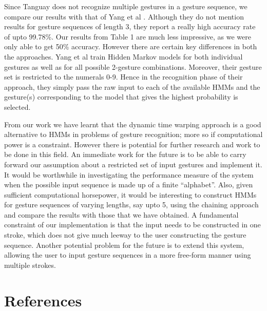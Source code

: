 \documentclass[twoside]{article}
\begin{document}
\begin{multicols}{2}
Since Tanguay does not recognize multiple gestures in a gesture sequence, we compare our results with that of Yang et al \cite{yang_gesture_1994}. Although they do not mention results for gesture sequences of length 3, they report a really high accuracy rate of upto 99.78\%. Our results from Table 1 are much less impressive, as we were only able to get 50\% accuracy. However there are certain key differences in both the approaches. Yang et al train Hidden Markov models for both individual gestures as well as for all possible 2-gesture combinations. Moreover, their gesture set is restricted to the numerals 0-9. Hence in the recognition phase of their approach, they simply pass the raw input to each of the available HMMs and the gesture(s) corresponding to the model that gives the highest probability is selected.

From our work we have learnt that the dynamic time warping approach is a good alternative to HMMs in problems of gesture recognition; more so if computational power is a constraint. However there is potential for further research and work to be done in this field. An immediate work for the future is to be able to carry forward our assumption about a restricted set of input gestures and implement it. It would be worthwhile in investigating the performance measure of the system when the possible input sequence is made up of a finite ``alphabet''. Also, given sufficient computational horsepower, it would be interesting to construct HMMs for gesture sequences of varying lengths, say upto 5, using the chaining approach and compare the results with those that we have obtained. A fundamental constraint of our implementation is that the input needs to be constructed in one stroke, which does not give much leeway to the user constructing the gesture sequence. Another potential problem for the future is to extend this system, allowing the user to input gesture sequences in a more free-form manner using multiple strokes.

\section{References}

\begin{spacing}{0.9}
	
%
\begingroup
\renewcommand{\section}[2]{}%

\endgroup
\end{spacing}

\end{multicols}
\end{document}
